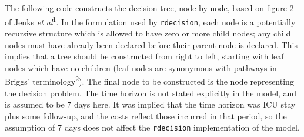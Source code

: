 \documentclass[]{article}
\begin{document}
The following code constructs the decision tree, node by node, based on
figure 2 of Jenks \emph{et al}\textsuperscript{1}. In the formulation
used by \texttt{rdecision}, each node is a potentially recursive
structure which is allowed to have zero or more child nodes; any child
nodes must have already been declared before their parent node is
declared. This implies that a tree should be constructed from right to
left, starting with leaf nodes which have no children (leaf nodes are
synonymous with pathways in Briggs' terminology\textsuperscript{2}). The
final node to be constructed is the node representing the decision
problem. The time horizon is not stated explicitly in the model, and is
assumed to be 7 days here. It was implied that the time horizon was ICU
stay plus some follow-up, and the costs reflect those incurred in that
period, so the assumption of 7 days does not affect the
\texttt{rdecision} implementation of the model.
\end{document}
